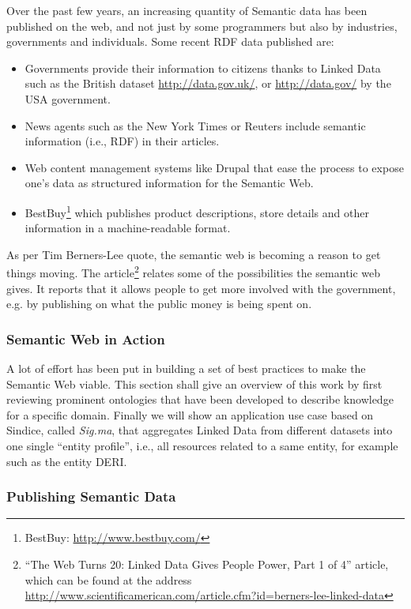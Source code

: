Over the past few years, an increasing quantity of Semantic data has been
published on the web, and not just by some programmers but also by industries,
governments and individuals. Some recent RDF data published are:
\begin{itemize}
  \item Governments provide their information to citizens thanks to Linked
  Data such as the British dataset \url{http://data.gov.uk/}, or
  \url{http://data.gov/} by the USA government.
  \item News agents such as the New York Times or Reuters include semantic
  information (i.e., RDF) in their articles.
  \item Web content management systems like Drupal that ease the process to
  expose one's data as structured information for the Semantic Web.
  \item BestBuy\footnote{BestBuy: \url{http://www.bestbuy.com/}} which publishes
  product descriptions, store details and other information in a machine-readable
  format.
\end{itemize}
As per Tim Berners-Lee quote, the semantic web is becoming a reason to get
things moving. The
article\footnote{``The Web Turns 20: Linked Data Gives People Power, Part 1 of
4'' article, which can be found at the address 
\url{http://www.scientificamerican.com/article.cfm?id=berners-lee-linked-data}}
relates some of the possibilities the semantic web gives. It reports that it
allows people to get more involved with the government, e.g. by publishing on
what the public money is being spent on.

\subsubsection{Semantic Web in Action}

A lot of effort has been put in building a set of best practices to make the
Semantic Web viable. This section shall give an overview of this work by first
reviewing prominent ontologies that have been developed to describe knowledge
for a specific domain. Finally we will show an application use case based on Sindice,
called \emph{Sig.ma}, that aggregates Linked Data from different datasets into
one single ``entity profile'', i.e., all resources related to a same entity,
for example such as the entity DERI.

\subsubsection{Publishing Semantic Data}

